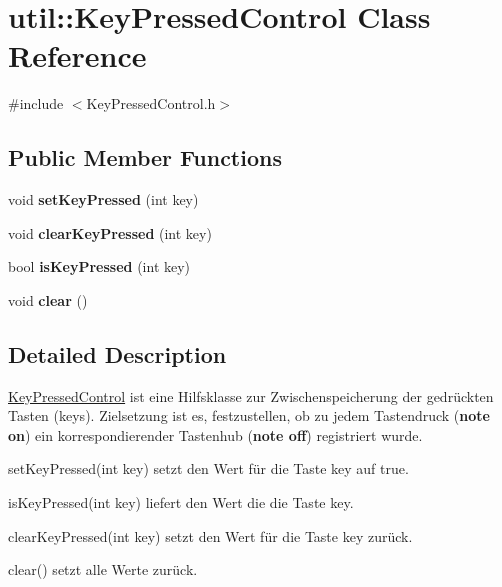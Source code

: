 \hypertarget{classutil_1_1KeyPressedControl}{\section{util\-:\-:Key\-Pressed\-Control Class Reference}
\label{classutil_1_1KeyPressedControl}
}


{\ttfamily \#include $<$Key\-Pressed\-Control.\-h$>$}

\subsection*{Public Member Functions}
\begin{DoxyCompactItemize}
\item 
\hypertarget{classutil_1_1KeyPressedControl_a0e465e30442619260ad7633883dac0a2}{void {\bfseries set\-Key\-Pressed} (int key)}\label{classutil_1_1KeyPressedControl_a0e465e30442619260ad7633883dac0a2}

\item 
\hypertarget{classutil_1_1KeyPressedControl_ab4e421ccffed2708a2379d02a5d29766}{void {\bfseries clear\-Key\-Pressed} (int key)}\label{classutil_1_1KeyPressedControl_ab4e421ccffed2708a2379d02a5d29766}

\item 
\hypertarget{classutil_1_1KeyPressedControl_a5ae3665ad89b7d30ce5640eeb129bbcf}{bool {\bfseries is\-Key\-Pressed} (int key)}\label{classutil_1_1KeyPressedControl_a5ae3665ad89b7d30ce5640eeb129bbcf}

\item 
\hypertarget{classutil_1_1KeyPressedControl_ad80ff7c3e12d9647a04cb8960333bb30}{void {\bfseries clear} ()}\label{classutil_1_1KeyPressedControl_ad80ff7c3e12d9647a04cb8960333bb30}

\end{DoxyCompactItemize}


\subsection{Detailed Description}
\hyperlink{classutil_1_1KeyPressedControl}{Key\-Pressed\-Control} ist eine Hilfsklasse zur Zwischenspeicherung der gedrückten Tasten (keys). Zielsetzung ist es, festzustellen, ob zu jedem Tastendruck ({\bfseries note on}) ein korrespondierender Tastenhub ({\bfseries note off}) registriert wurde.


\begin{DoxyItemize}
\item set\-Key\-Pressed(int key) setzt den Wert für die Taste key auf true.
\item is\-Key\-Pressed(int key) liefert den Wert die die Taste key.
\item clear\-Key\-Pressed(int key) setzt den Wert für die Taste key zurück.
\item clear() setzt alle Werte zurück.
\end{DoxyItemize}

